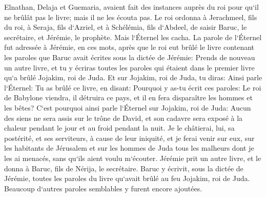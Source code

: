\verse Elnathan, Delaja et Guemaria, avaient fait des instances auprès du roi pour qu`il ne brûlât pas le livre; mais il ne les écouta pas. 
\verse Le roi ordonna à Jerachmeel, fils du roi, à Seraja, fils d`Azriel, et à Schélémia, fils d`Abdeel, de saisir Baruc, le secrétaire, et Jérémie, le prophète. Mais l`Éternel les cacha. 
\verse La parole de l`Éternel fut adressée à Jérémie, en ces mots, après que le roi eut brûlé le livre contenant les paroles que Baruc avait écrites sous la dictée de Jérémie: 
\verse Prends de nouveau un autre livre, et tu y écriras toutes les paroles qui étaient dans le premier livre qu`a brûlé Jojakim, roi de Juda. 
\verse Et sur Jojakim, roi de Juda, tu diras: Ainsi parle l`Éternel: Tu as brûlé ce livre, en disant: Pourquoi y as-tu écrit ces paroles: Le roi de Babylone viendra, il détruira ce pays, et il en fera disparaître les hommes et les bêtes? 
\verse C`est pourquoi ainsi parle l`Éternel sur Jojakim, roi de Juda: Aucun des siens ne sera assis sur le trône de David, et son cadavre sera exposé à la chaleur pendant le jour et au froid pendant la nuit. 
\verse Je le châtierai, lui, sa postérité, et ses serviteurs, à cause de leur iniquité, et je ferai venir sur eux, sur les habitants de Jérusalem et sur les hommes de Juda tous les malheurs dont je les ai menacés, sans qu`ils aient voulu m`écouter. 
\verse Jérémie prit un autre livre, et le donna à Baruc, fils de Nérija, le secrétaire. Baruc y écrivit, sous la dictée de Jérémie, toutes les paroles du livre qu`avait brûlé au feu Jojakim, roi de Juda. Beaucoup d`autres paroles semblables y furent encore ajoutées. 

